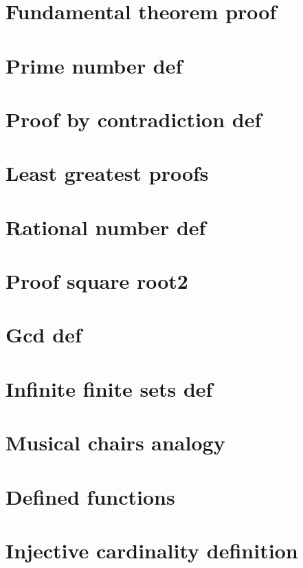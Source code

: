 \section*{Fundamental theorem proof}

\vfill
\section*{Prime number def}

\vfill
\section*{Proof by contradiction def}

\vfill
\section*{Least greatest proofs}

\vfill
\section*{Rational number def}

\vfill
\section*{Proof square root2}

\vfill
\section*{Gcd def}

\vfill
\section*{Infinite finite sets def}

\vfill
\section*{Musical chairs analogy}

\vfill
\section*{Defined functions}

\vfill
\section*{Injective cardinality definition}

\vfill
